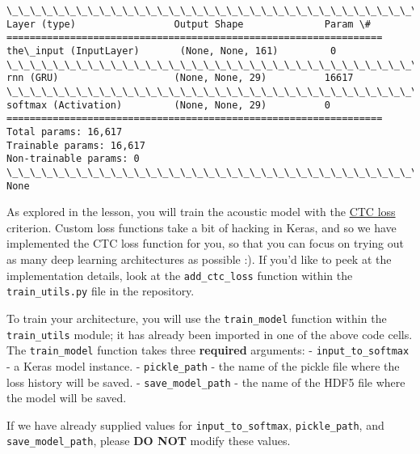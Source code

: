 \documentclass[11pt]{article}
\begin{document}
    \begin{Verbatim}[commandchars=\\\{\}]
\_\_\_\_\_\_\_\_\_\_\_\_\_\_\_\_\_\_\_\_\_\_\_\_\_\_\_\_\_\_\_\_\_\_\_\_\_\_\_\_\_\_\_\_\_\_\_\_\_\_\_\_\_\_\_\_\_\_\_\_\_\_\_\_\_
Layer (type)                 Output Shape              Param \#   
=================================================================
the\_input (InputLayer)       (None, None, 161)         0         
\_\_\_\_\_\_\_\_\_\_\_\_\_\_\_\_\_\_\_\_\_\_\_\_\_\_\_\_\_\_\_\_\_\_\_\_\_\_\_\_\_\_\_\_\_\_\_\_\_\_\_\_\_\_\_\_\_\_\_\_\_\_\_\_\_
rnn (GRU)                    (None, None, 29)          16617     
\_\_\_\_\_\_\_\_\_\_\_\_\_\_\_\_\_\_\_\_\_\_\_\_\_\_\_\_\_\_\_\_\_\_\_\_\_\_\_\_\_\_\_\_\_\_\_\_\_\_\_\_\_\_\_\_\_\_\_\_\_\_\_\_\_
softmax (Activation)         (None, None, 29)          0         
=================================================================
Total params: 16,617
Trainable params: 16,617
Non-trainable params: 0
\_\_\_\_\_\_\_\_\_\_\_\_\_\_\_\_\_\_\_\_\_\_\_\_\_\_\_\_\_\_\_\_\_\_\_\_\_\_\_\_\_\_\_\_\_\_\_\_\_\_\_\_\_\_\_\_\_\_\_\_\_\_\_\_\_
None

    \end{Verbatim}

    As explored in the lesson, you will train the acoustic model with the
\href{http://www.cs.toronto.edu/~graves/icml_2006.pdf}{CTC loss}
criterion. Custom loss functions take a bit of hacking in Keras, and so
we have implemented the CTC loss function for you, so that you can focus
on trying out as many deep learning architectures as possible :). If
you'd like to peek at the implementation details, look at the
\texttt{add\_ctc\_loss} function within the \texttt{train\_utils.py}
file in the repository.

To train your architecture, you will use the \texttt{train\_model}
function within the \texttt{train\_utils} module; it has already been
imported in one of the above code cells. The \texttt{train\_model}
function takes three \textbf{required} arguments: -
\texttt{input\_to\_softmax} - a Keras model instance. -
\texttt{pickle\_path} - the name of the pickle file where the loss
history will be saved. - \texttt{save\_model\_path} - the name of the
HDF5 file where the model will be saved.

If we have already supplied values for \texttt{input\_to\_softmax},
\texttt{pickle\_path}, and \texttt{save\_model\_path}, please \textbf{DO
NOT} modify these values.
\end{document}
